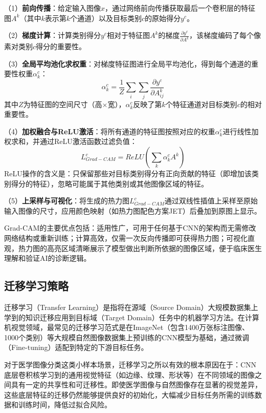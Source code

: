 （1）\textbf{前向传播}：给定输入图像$x$，通过网络前向传播获取最后一个卷积层的特征图$A^k$（其中$k$表示第$k$个通道）以及目标类别$c$的原始得分$y^c$。

（2）\textbf{梯度计算}：计算类别得分$y^c$相对于特征图$A^k$的梯度$\frac{\partial y^c}{\partial A^k}$，该梯度编码了每个像素对类别$c$得分的重要性。

（3）\textbf{全局平均池化求权重}：对梯度特征图进行全局平均池化，得到每个通道的重要性权重$\alpha_k^c$：
\begin{equation}
    \label{eq:gradcam_alpha}
    \alpha_k^c = \frac{1}{Z}\sum_i \sum_j \frac{\partial y^c}{\partial A_{ij}^k}
\end{equation}
其中$Z$为特征图的空间尺寸（高$\times$宽），$\alpha_k^c$反映了第$k$个特征通道对目标类别$c$的相对重要性。

（4）\textbf{加权融合与ReLU激活}：将所有通道的特征图按照对应的权重$\alpha_k^c$进行线性加权求和，并通过ReLU激活函数过滤负值：
\begin{equation}
    \label{eq:gradcam_heatmap}
    L_{Grad-CAM}^c = ReLU\left(\sum_k \alpha_k^c A^k\right)
\end{equation}
ReLU操作的含义是：只保留那些对目标类别得分有正向贡献的特征（即增加该类别得分的特征），忽略可能属于其他类别或其他图像区域的特征。

（5）\textbf{上采样与可视化}：将生成的热力图$L_{Grad-CAM}^c$通过双线性插值上采样至原始输入图像的尺寸，应用颜色映射（如热力图配色方案JET）后叠加到原图上显示。

Grad-CAM的主要优点包括：适用性广，可用于任何基于CNN的架构而无需修改网络结构或重新训练；计算高效，仅需一次反向传播即可获得热力图；可视化直观，热力图的高亮区域清晰展示了模型做出判断所依据的图像区域，便于临床医生理解和验证AI的诊断逻辑。


\subsection{迁移学习策略}

迁移学习（Transfer Learning）是指将在源域（Source Domain）大规模数据集上学到的知识迁移应用到目标域（Target Domain）任务中的机器学习方法\cite{pan2009survey}。在计算机视觉领域，最常见的迁移学习范式是在ImageNet（包含1400万张标注图像、1000个类别）等大规模自然图像数据集上预训练的CNN模型为基础，通过微调（Fine-tuning）适配到特定的下游目标任务。

对于医学图像分类这类小样本场景，迁移学习之所以有效的根本原因在于：CNN底层卷积核学习到的通用视觉特征（如边缘、纹理、形状等）在不同领域的图像之间具有一定的共享性和可迁移性。即使医学图像与自然图像存在显著的视觉差异，这些底层特征的迁移仍然能够提供良好的初始化，大幅减少目标任务所需的训练数据和训练时间，降低过拟合风险。

